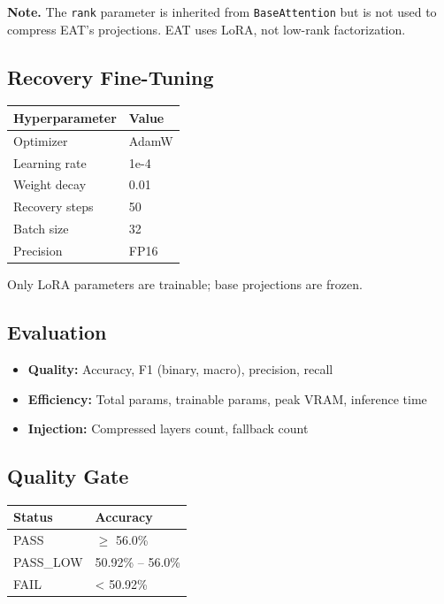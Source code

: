 \textbf{Note.} The \texttt{rank} parameter is inherited from \texttt{BaseAttention} but is not 
used to compress EAT's projections. EAT uses LoRA, not low-rank factorization.

\subsection{Recovery Fine-Tuning}

\begin{table}[H]
\centering
\small
\begin{tabular}{ll}
\toprule
\textbf{Hyperparameter} & \textbf{Value} \\
\midrule
Optimizer & AdamW \\
Learning rate & 1e-4 \\
Weight decay & 0.01 \\
Recovery steps & 50 \\
Batch size & 32 \\
Precision & FP16 \\
\bottomrule
\end{tabular}
\end{table}

Only LoRA parameters are trainable; base projections are frozen.

\subsection{Evaluation}

\begin{itemize}
\item \textbf{Quality:} Accuracy, F1 (binary, macro), precision, recall
\item \textbf{Efficiency:} Total params, trainable params, peak VRAM, inference time
\item \textbf{Injection:} Compressed layers count, fallback count

\end{itemize}
\subsection{Quality Gate}

\begin{table}[H]
\centering
\small
\begin{tabular}{ll}
\toprule
\textbf{Status} & \textbf{Accuracy} \\
\midrule
PASS & $\ge$ 56.0\% \\
PASS\_LOW & 50.92\% -- 56.0\% \\
FAIL & < 50.92\% \\
\bottomrule
\end{tabular}
\end{table}

